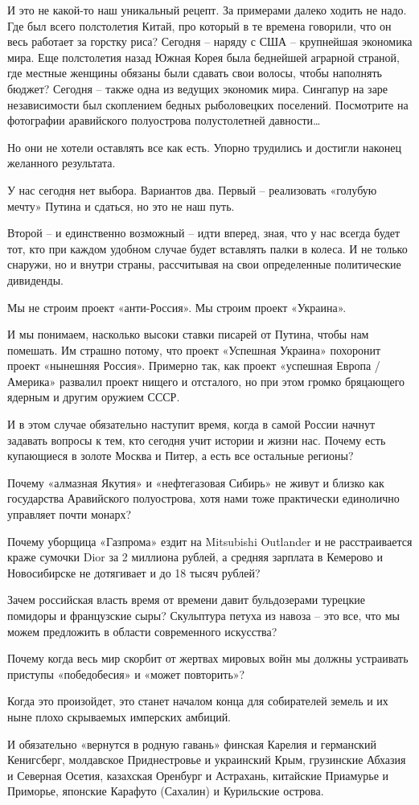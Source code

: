 И это не какой-то наш уникальный рецепт. За примерами далеко ходить не надо.
Где был всего полстолетия Китай, про который в те времена говорили, что он весь
работает за горстку риса? Сегодня – наряду с США – крупнейшая экономика мира.
Еще полстолетия назад Южная Корея была беднейшей аграрной страной, где местные
женщины обязаны были сдавать свои волосы, чтобы наполнять бюджет? Сегодня –
также одна из ведущих экономик мира. Сингапур на заре независимости был
скоплением бедных рыболовецких поселений. Посмотрите на фотографии аравийского
полуострова полустолетней давности…

Но они не хотели оставлять все как есть. Упорно трудились и достигли наконец
желанного результата.

У нас сегодня нет выбора. Вариантов два. Первый – реализовать «голубую мечту»
Путина и сдаться, но это не наш путь. 

Второй – и единственно возможный – идти вперед, зная, что у нас всегда будет
тот, кто при каждом удобном случае будет вставлять палки в колеса. И не только
снаружи, но и внутри страны, рассчитывая на свои определенные политические
дивиденды.

Мы не строим проект «анти-Россия». Мы строим проект «Украина».

И мы понимаем, насколько высоки ставки писарей от Путина, чтобы нам помешать.
Им страшно потому, что проект «Успешная Украина» похоронит проект «нынешняя
Россия». Примерно так, как проект «успешная Европа / Америка» развалил проект
нищего и отсталого, но при этом громко бряцающего ядерным и другим оружием
СССР.

И в этом случае обязательно наступит время, когда в самой России начнут
задавать вопросы к тем, кто сегодня учит истории и жизни нас. Почему есть
купающиеся в золоте Москва и Питер, а есть все остальные регионы? 

Почему «алмазная Якутия» и «нефтегазовая Сибирь» не живут и близко как
государства Аравийского полуострова, хотя нами тоже практически единолично
управляет почти монарх? 

Почему уборщица «Газпрома» ездит на Mitsubishi Outlander и не расстраивается
краже сумочки Dior за 2 миллиона рублей, а средняя зарплата в Кемерово и
Новосибирске не дотягивает и до 18 тысяч рублей? 

Зачем российская власть время от времени давит бульдозерами турецкие помидоры и
французские сыры? Скульптура петуха из навоза – это все, что мы можем
предложить в области современного искусства? 

Почему когда весь мир скорбит от жертвах мировых войн мы должны устраивать
приступы «победобесия» и «может повторить»?

Когда это произойдет, это станет началом конца для собирателей земель и их ныне
плохо скрываемых имперских амбиций. 

И обязательно «вернутся в родную гавань» финская Карелия и германский
Кенигсберг, молдавское Приднестровье и украинский Крым, грузинские Абхазия и
Северная Осетия, казахская Оренбург и Астрахань, китайские Приамурье и
Приморье, японские Карафуто (Сахалин) и Курильские острова.




